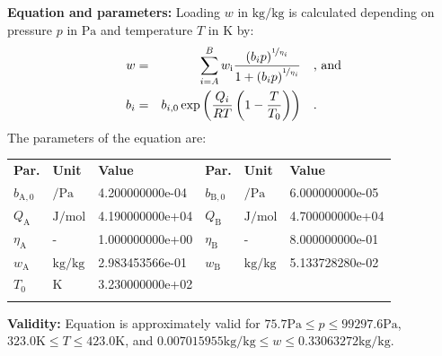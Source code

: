 \textbf{Equation and parameters:}
\newline
%
Loading $w$ in $\si{\kilogram\per\kilogram}$ is calculated depending on pressure $p$ in $\si{\pascal}$ and temperature $T$ in $\si{\kelvin}$ by:
%
\begin{equation*}
\begin{split}
w &=& \sum_{i=A}^{B} w_\mathrm{i} \frac{\left( b_i p \right) ^ {\nicefrac{1}{\eta_i}} }{1 + \left( b_i p \right) ^ {\nicefrac{1}{\eta_i}}} & \quad\text{, and} \\
b_i &=& b_{i,0} \exp \left( \frac{Q_i}{R T} \left( 1 - \frac{T}{T_0} \right) \right) & \quad\text{.}
\end{split}
\end{equation*}
%
The parameters of the equation are:
%
\begin{longtable}[l]{lll|lll}
\toprule
\addlinespace
\textbf{Par.} & \textbf{Unit} & \textbf{Value} &	\textbf{Par.} & \textbf{Unit} & \textbf{Value} \\
\addlinespace
\midrule
\endhead

\bottomrule
\endfoot
\bottomrule
\endlastfoot
\addlinespace

$b_\mathrm{A,0}$ & $\si{\per\pascal}$ & 4.200000000e-04 & $b_\mathrm{B,0}$ & $\si{\per\pascal}$ & 6.000000000e-05 \\
$Q_\mathrm{A}$ & $\si{\joule\per\mole}$ & 4.190000000e+04 & $Q_\mathrm{B}$ & $\si{\joule\per\mole}$ & 4.700000000e+04 \\
$\eta_\mathrm{A}$ & - & 1.000000000e+00 & $\eta_\mathrm{B}$ & - & 8.000000000e-01 \\
$w_\mathrm{A}$ & $\si{\kilogram\per\kilogram}$ & 2.983453566e-01 & $w_\mathrm{B}$ & $\si{\kilogram\per\kilogram}$ & 5.133728280e-02 \\
$T_0$ & $\si{\kelvin}$ & 3.230000000e+02 & & & \\

\addlinespace\end{longtable}

\textbf{Validity:}
\newline
Equation is approximately valid for $75.7 \si{\pascal} \leq p \leq 99297.6 \si{\pascal}$,  $323.0 \si{\kelvin} \leq T \leq 423.0 \si{\kelvin}$, and $0.007015955 \si{\kilogram\per\kilogram} \leq w \leq 0.33063272 \si{\kilogram\per\kilogram}$.
\newline

